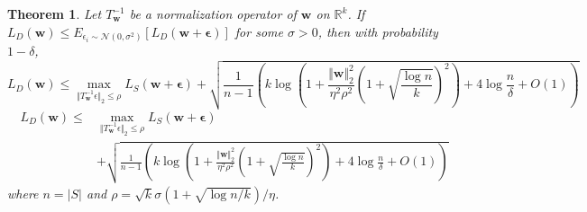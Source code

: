 \documentclass{article}
\newcommand{\mf}[1]{\mathbf{#1}}
\newtheorem{thm}{Theorem}
\begin{document}
\begin{thm}
Let $T^{-1}_\mf{w}$ be a normalization operator of $\mf{w}$ on $\mathbb{R}^k$.
If $L_D(\mf w) \leq E_{\epsilon_i \sim \mathcal{N}(0, \sigma^2)} [L_D(\mf w+\bm\epsilon)]$ for some $\sigma > 0$,
then with probability $1-\delta$, 
\ificml
    \[L_D(\mf{w}) \leq \max_{\Vert T^{-1}_\mf{w} \epsilon\Vert_2 \leq \rho} L_S(\mf w+\bm\epsilon)  + \sqrt{\frac{1}{n-1}\left(k\log\left(1 + \frac{\Vert \mf w\Vert_2^2}{\eta^2\rho^2} \left(1+\sqrt{\frac{\log n}{k}}\right)^2 \right) + 4\log\frac{n}{\delta} + O(1)\right)}\]
\else
    \begin{align}
        \nonumber L_D(\mf{w}) \leq & \max_{\Vert T^{-1}_\mf{w} \epsilon\Vert_2 \leq \rho} L_S(\mf w+\bm\epsilon) \\
        \nonumber & + \sqrt{\frac{1}{n-1}\left(k\log\left(1 + \frac{\Vert \mf w\Vert_2^2}{\eta^2\rho^2} \left(1+\sqrt{\frac{\log n}{k}}\right)^2 \right) + 4\log\frac{n}{\delta} + O(1)\right)}
    \end{align}
\fi
where $n = \vert S\vert$ and $\rho = \sqrt{k}\sigma (1+\sqrt{\log n / k}) /\eta$.
\end{thm}
\end{document}
